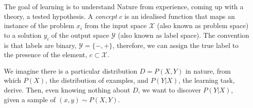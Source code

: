 \documentclass[
  letterpaper,
  12pt,
  british]{tufte-book}
\theoremstyle{plain}
\theoremstyle{plain}
\theoremstyle{definition}
\theoremstyle{remark}
\begin{document}
The goal of learning is to understand Nature from experience, coming up
with a theory, a tested hypothesis. A \emph{concept} \(c\) is an
idealised function that maps an instance of the problem \(\mathit{x}_i\)
from the input space \(\mathcal{X}\) (also known as problem space) to a
solution \(\mathit{y}_i\) of the output space \(\mathcal{Y}\) (also
known as label space). The convention is that labels are binary,
\(\mathcal{Y}= \{-, +\}\), therefore, we can assign the true label to
the presence of the element, \(c \subset \mathcal{X}\).

We imagine there is a particular distribution
\(D= P(\mathit{X},\mathit{Y})\) in nature, from which \(P(\mathit{X})\),
the distribution of examples, and \(P(\mathit{Y}|\mathit{X})\), the
learning task, derive. Then, even knowing nothing about \(D\), we want
to discover \(P(\mathit{Y}|\mathit{X})\), given a sample of
\((x, y) \sim P(\mathit{X},\mathit{Y})\).



\backmatter
\end{document}
